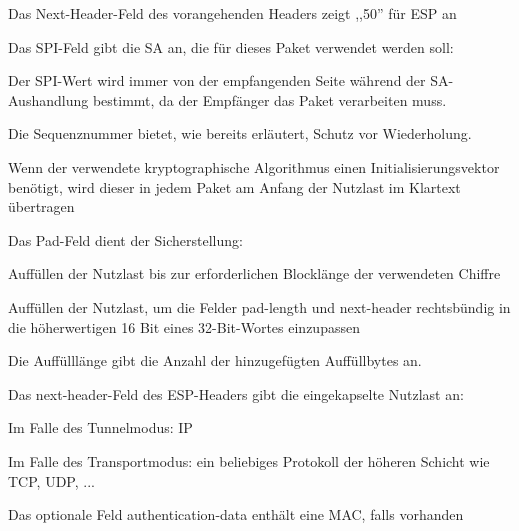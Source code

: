 \documentclass[a4paper]{article}
\begin{document}
\begin{multicols}{3}
\begin{itemize*}
\begin{itemize*}
                  \item Das Next-Header-Feld des vorangehenden Headers zeigt ,,50'' für ESP an
                  \item Das SPI-Feld gibt die SA an, die für dieses Paket verwendet werden soll:
                  \begin{itemize*}
                        \item Der SPI-Wert wird immer von der empfangenden Seite während der SA-Aushandlung bestimmt, da der Empfänger das Paket verarbeiten muss.
                  \end{itemize*}
                  \item Die Sequenznummer bietet, wie bereits erläutert, Schutz vor Wiederholung.
                  \item Wenn der verwendete kryptographische Algorithmus einen Initialisierungsvektor benötigt, wird dieser in jedem Paket am Anfang der Nutzlast im Klartext übertragen
                  \item Das Pad-Feld dient der Sicherstellung:
                  \begin{itemize*}
                        \item Auffüllen der Nutzlast bis zur erforderlichen Blocklänge der verwendeten Chiffre
                        \item Auffüllen der Nutzlast, um die Felder pad-length und next-header rechtsbündig in die höherwertigen 16 Bit eines 32-Bit-Wortes einzupassen
                  \end{itemize*}
                  \item Die Auffülllänge gibt die Anzahl der hinzugefügten Auffüllbytes an.
                  \item Das next-header-Feld des ESP-Headers gibt die eingekapselte Nutzlast an:
                  \begin{itemize*}
                        \item Im Falle des Tunnelmodus: IP
                        \item Im Falle des Transportmodus: ein beliebiges Protokoll der höheren Schicht wie TCP, UDP, ...
                  \end{itemize*}
                  \item Das optionale Feld authentication-data enthält eine MAC, falls vorhanden
            \end{itemize*}

\end{itemize*}
\end{multicols}
\end{document}
